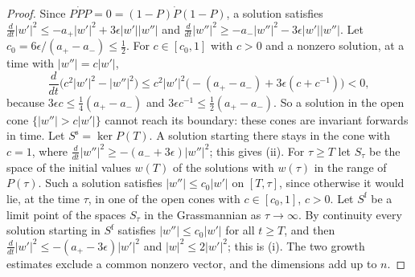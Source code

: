 \begin{proof}
Since $P\dot PP=0=(1-P)\dot P(1-P)$, a solution satisfies
$\frac d{dt}|w'|^2\leq-a_+|w'|^2+3\epsilon|w'||w''|$ and
$\frac d{dt}|w''|^2\geq-a_-|w''|^2-3\epsilon|w'||w''|$. Let
$c_0=6\epsilon/(a_+-a_-)\leq\frac12$. For $c\in[c_0,1]$ with $c>0$ and a
nonzero solution, at a time with $|w''|=c|w'|$,
\[
 \frac d{dt}\bigl(c^2|w'|^2-|w''|^2\bigr)\leq c^2|w'|^2\bigl(-(a_+-a_-)+3\epsilon(c+c^{-1})\bigr)<0,
\]
because $3\epsilon c\leq\frac14(a_+-a_-)$ and
$3\epsilon c^{-1}\leq\frac12(a_+-a_-)$. So a solution in the open cone
$\{|w''|>c|w'|\}$ cannot reach its boundary: these cones are invariant
forwards in time. Let $S^{\mathrm s}=\ker P(T)$. A solution starting there
stays in the cone with $c=1$, where
$\frac d{dt}|w''|^2\geq-(a_-+3\epsilon)|w''|^2$; this gives (ii). For
$\tau\geq T$ let $S_\tau$ be the space of the initial values $w(T)$ of the
solutions with $w(\tau)$ in the range of $P(\tau)$. Such a solution
satisfies $|w''|\leq c_0|w'|$ on $[T,\tau]$, since otherwise it would lie, at
the time $\tau$, in one of the open cones with $c\in[c_0,1]$, $c>0$. Let $S^{\mathrm f}$ be a
limit point of the spaces $S_\tau$ in the Grassmannian as $\tau\to\infty$.
By continuity every solution starting in $S^{\mathrm f}$ satisfies
$|w''|\leq c_0|w'|$ for all $t\geq T$, and then
$\frac d{dt}|w'|^2\leq-(a_+-3\epsilon)|w'|^2$ and $|w|^2\leq2|w'|^2$; this is
(i). The two growth estimates exclude a common nonzero vector, and the
dimensions add up to $n$.
\end{proof}

